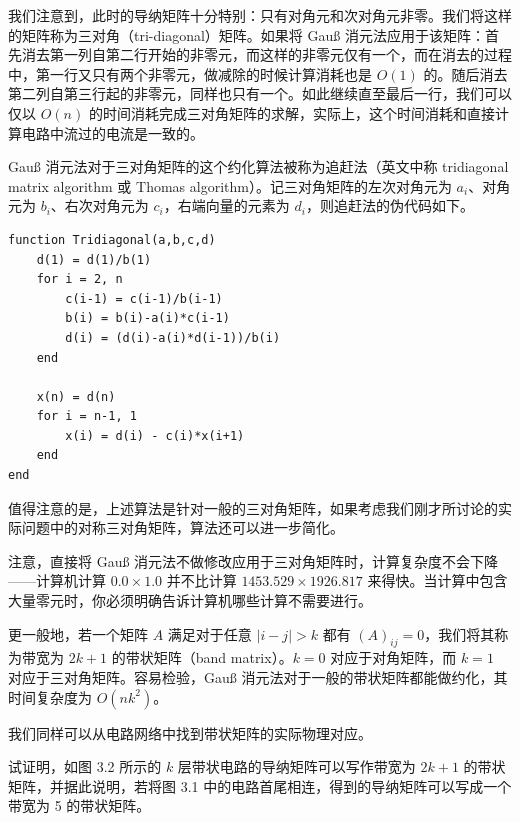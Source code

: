我们注意到，此时的导纳矩阵十分特别：只有对角元和次对角元非零。我们将这样的矩阵称为三对角（tri-diagonal）矩阵。如果将 Gauß 消元法应用于该矩阵：首先消去第一列自第二行开始的非零元，而这样的非零元仅有一个，而在消去的过程中，第一行又只有两个非零元，做减除的时候计算消耗也是 $O(1)$ 的。随后消去第二列自第三行起的非零元，同样也只有一个。如此继续直至最后一行，我们可以仅以 $O(n)$ 的时间消耗完成三对角矩阵的求解，实际上，这个时间消耗和直接计算电路中流过的电流是一致的。

Gauß 消元法对于三对角矩阵的这个约化算法被称为追赶法（英文中称 tridiagonal matrix algorithm 或 Thomas algorithm）。记三对角矩阵的左次对角元为 $a_i$、对角元为 $b_i$、右次对角元为 $c_i$，右端向量的元素为 $d_i$，则追赶法的伪代码如下。

\begin{algorithmBox}
\begin{lstlisting}[style=bellacode]
function Tridiagonal(a,b,c,d)
    d(1) = d(1)/b(1)
    for i = 2, n
        c(i-1) = c(i-1)/b(i-1)
        b(i) = b(i)-a(i)*c(i-1)
        d(i) = (d(i)-a(i)*d(i-1))/b(i)
    end

    x(n) = d(n)
    for i = n-1, 1
        x(i) = d(i) - c(i)*x(i+1)
    end
end
\end{lstlisting}
\end{algorithmBox}

值得注意的是，上述算法是针对一般的三对角矩阵，如果考虑我们刚才所讨论的实际问题中的对称三对角矩阵，算法还可以进一步简化。

注意，直接将 Gauß 消元法不做修改应用于三对角矩阵时，计算复杂度不会下降——计算机计算 $0.0\times1.0$ 并不比计算 $1453.529\times1926.817$ 来得快。当计算中包含大量零元时，你必须明确告诉计算机哪些计算不需要进行。

更一般地，若一个矩阵 $A$ 满足对于任意 $|i-j|>k$ 都有 $(A)_{ij}=0$，我们将其称为带宽为 $2k+1$ 的带状矩阵（band matrix）。$k=0$ 对应于对角矩阵，而 $k=1$ 对应于三对角矩阵。容易检验，Gauß 消元法对于一般的带状矩阵都能做约化，其时间复杂度为 $O(nk^2)$。

我们同样可以从电路网络中找到带状矩阵的实际物理对应。

\begin{exerciseBox}[练习 3.1]
试证明，如图 3.2 所示的 $k$ 层带状电路的导纳矩阵可以写作带宽为 $2k+1$ 的带状矩阵，并据此说明，若将图 3.1 中的电路首尾相连，得到的导纳矩阵可以写成一个带宽为 5 的带状矩阵。
\end{exerciseBox}

